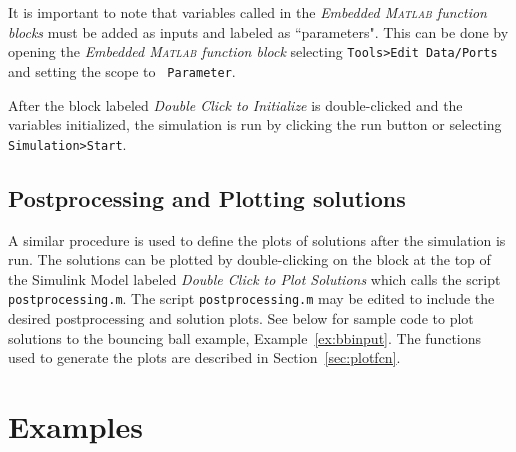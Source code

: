 \documentclass{article}
\newcommand{\matlab}{\textsc{Matlab}}
\begin{document}
% 
\label{scr:initializationBB_inst}

It is important to note that variables called in the 
{\em Embedded \matlab{} function blocks}
must be added as inputs and labeled as ``parameters". 
This can be done by opening the {\em Embedded \matlab{} function block}
selecting {\tt Tools>Edit Data/Ports} and setting the scope to {\tt
Parameter}.

After the block labeled {\em Double Click to Initialize} is double-clicked 
and the variables initialized, the simulation is run by clicking the run button 
or selecting {\tt Simulation>Start}.


\subsection{Postprocessing and Plotting solutions}
\label{sec:postprocessing}

A similar procedure is used to define the plots of solutions after the simulation is run. 
The solutions can be plotted by double-clicking on the block at the top of the Simulink Model 
labeled {\em Double Click to Plot Solutions} which calls the script {\tt postprocessing.m}. 
The script {\tt postprocessing.m} may be edited to include the desired postprocessing and solution plots. 
See below for sample code to plot solutions to the bouncing ball example, Example~\ref{ex:bbinput}. 
The functions used to generate the plots are described in Section~\ref{sec:plotfcn}.\\

% 
\label{scr:postprocesingBB_inst}



\section{Examples}
\label{sec:examples}












\end{document}
